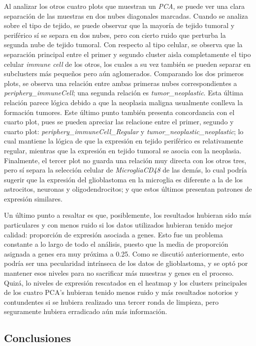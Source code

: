 \documentclass[
]{article}
\begin{document}
Al analizar los otros cuatro plots que muestran un \emph{PCA}, se puede
ver una clara separación de las muestras en dos nubes diagonales
marcadas. Cuando se analiza sobre el tipo de tejido, se puede observar
que la mayoría de tejido tumoral y periférico sí se separa en dos nubes,
pero con cierto ruido que perturba la segunda nube de tejido tumoral.
Con respecto al tipo celular, se observa que la separación principal
entre el primer y segundo cluster aisla completamente el tipo celular
\emph{immune cell} de los otros, los cuales a su vez también se pueden
separar en subclusters más pequeños pero aún aglomerados. Comparando los
dos primeros plots, se observa una relación entre ambas primeras nubes
correspondientes a \emph{periphery\_immuneCell}; una segunda relación es
\emph{tumor\_neoplastic}. Esta última relación parece lógica debido a
que la neoplasia maligna usualmente conlleva la formación tumores. Este
último punto también presenta concordancia con el cuarto plot, pues se
pueden apreciar las relacione entre el primer, segundo y cuarto plot:
\emph{periphery\_immuneCell\_Regular} y
\emph{tumor\_neoplastic\_neoplastic}; lo cual mantiene la lógica de que
la expresión en tejido periférico es relativamente regular, mientras que
la expresión en tejido tumoral se asocia con la neoplasia. Finalmente,
el tercer plot no guarda una relación muy directa con los otros tres,
pero sí separa la selección celular de \emph{MicrogliaCD48} de las
demás, lo cual podría sugerir que la expresión del glioblastoma en la
microglia es diferente a la de los astrocitos, neuronas y
oligodendrocitos; y que estos últimos presentan patrones de expresión
similares.

Un último punto a resaltar es que, posiblemente, los resultados hubieran
sido más particulares y con menos ruido si los datos utilizados hubieran
tenido mejor calidad: proporción de expresión asociada a genes. Esto fue
un problema constante a lo largo de todo el análisis, puesto que la
media de proporción asignada a genes era muy próxima a 0.25. Como se
discutió anteriormente, esto podría ser una pecularidad intrínseca de
los datos de glioblastoma, y se optó por mantener esos niveles para no
sacrificar más muestras y genes en el proceso. Quizá, lo niveles de
expresión rescatados en el heatmap y los clusters principales de los
cuatro PCA's hubieran tenido menos ruido y más resultados notorios y
contundentes si se hubiera realizado una tercer ronda de limpieza, pero
seguramente hubiera erradicado aún más información.

\hypertarget{conclusiones}{%
\subsection{Conclusiones}\label{conclusiones}}
\end{document}
